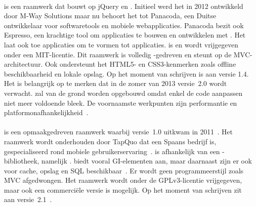 \paragraph{\tmp} %
\tmp{} is een raamwerk dat bouwt op jQuery en \jqm{}.
Initieel werd het in 2012 ontwikkeld door M-Way Solutions maar nu behoort het tot Panacoda,  een Duitse ontwikkelaar voor softwaretools en mobiele webapplicaties.
Panacoda bezit ook Espresso,  een krachtige tool om applicaties te bouwen en ontwikkelen met \tmp{}.
Het laat ook toe applicaties om te vormen tot  applicaties. 
\tmp{} is  en wordt vrijgegeven onder een MIT-licentie.
Dit raamwerk is volledig \js{}-gedreven en steunt op de MVC-architectuur.
Ook ondersteunt het HTML5- en CSS3-kenmerken zoals offline  beschikbaarheid en lokale opslag.
Op het moment van schrijven is \tmp{} aan versie 1.4.
Het is belangrijk op te merken dat in de zomer van 2013 versie~2.0 wordt verwacht.  
\tmp{} zal van de grond worden opgebouwd omdat enkel de code aanpassen niet meer voldoende bleek.  
De voornaamste werkpunten zijn performantie en platformonafhankelijkheid~\cite{Panacoda,Laubach2013}.

\paragraph{\lungo} %
\lungo{} is een opmaakgedreven raamwerk waarbij versie~1.0 uitkwam in 2011~\cite{TapQuo2011}.
Het raamwerk wordt onderhouden door TapQuo dat een Spaans bedrijf is, gespecialiseerd rond mobiele gebruikerservaring~\cite{TapQuo2013a}.
\lungo{} is afhankelijk van een \js{}-bibliotheek, namelijk \quo{}.
\lungo{} biedt vooral GI-elementen aan, maar daarnaast zijn er ook  voor cache, opslag en SQL beschikbaar~\cite{TapQuo2013}.
Er wordt geen programmeerstijl zoals MVC afgedwongen.
Het raamwerk wordt onder de GPLv3-licentie vrijgegeven, maar ook een commerciële versie is mogelijk.
Op het moment van schrijven zit \lungo{} aan versie~2.1~\cite{TapQuo2013}.

